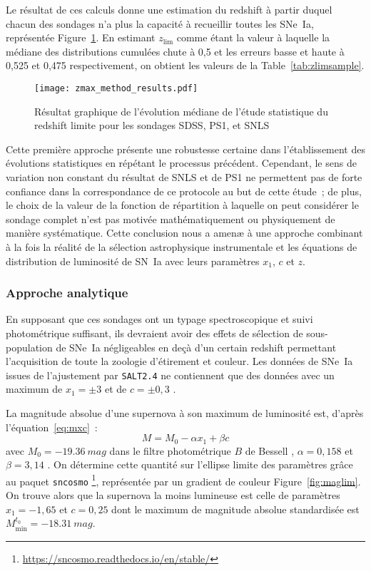 \documentclass[../main/main.tex]{subfiles}
\begin{document}
Le résultat de ces calculs donne une estimation du redshift à partir duquel
chacun des sondages n'a plus la capacité à recueillir toutes les SNe~Ia,
représentée Figure~\ref{fig:zmax_method_results}. En estimant $z_{\lim}$ comme
étant la valeur à laquelle la médiane des distributions cumulées chute à 0,5 et
les erreurs basse et haute à 0,525 et 0,475 respectivement, on obtient les
valeurs de la Table~\ref{tab:zlimsample}.

\begin{figure}[ht]
    \centering
    \texttt{[image: zmax\_method\_results.pdf]}
    \captionsetup{justification=centering}
    \caption{Résultat graphique de l'évolution médiane de l'étude statistique du
    redshift limite pour les sondages SDSS, PS1, et SNLS}
    \label{fig:zmax_method_results}
\end{figure}

Cette première approche présente une robustesse certaine dans l'établissement
des évolutions statistiques en répétant le processus précédent. Cependant, le
sens de variation non constant du résultat de SNLS et de PS1 ne permettent pas
de forte confiance dans la correspondance de ce protocole au but de cette
étude~; de plus, le choix de la valeur de la fonction de répartition à laquelle
on peut considérer le sondage complet n'est pas motivée mathématiquement ou
physiquement de manière systématique. Cette conclusion nous a amenæ à une
approche combinant à la fois la réalité de la sélection astrophysique
instrumentale et les équations de distribution de luminosité de SN~Ia avec leurs
paramètres $x_1$, $c$ et $z$.

\subsubsection{Approche analytique}\label{sssec:maglim}

En supposant que ces sondages ont un typage spectroscopique et suivi
photométrique suffisant, ils devraient avoir des effets de sélection de
sous-population de SNe~Ia négligeables en deçà d'un certain redshift permettant
l'acquisition de toute la zoologie d'étirement et couleur. Les données de SNe~Ia
issues de l'ajustement par \texttt{SALT2.4} ne contiennent que des données avec
un maximum de $x_1 = \pm 3$ et de $c = \pm 0,3$ \citep[][cf
Section~\ref{ssec:salt}]{guy2007, betoule2014}.

La magnitude absolue d'une supernova à son maximum de luminosité est, d'après
l'équation~\ref{eq:mxc}~:
\begin{equation*}
    M = M_0 -\alpha x_1 + \beta c
\end{equation*}
avec $M_0 = \SI{-19,36}{mag}$ dans le filtre photométrique $B$ de Bessell
\citep{kessler2009a, scolnic2014}, $\alpha=0,158$ et $\beta=3,14$
\citep[Table 7,][]{scolnic2018}. On détermine cette quantité sur l'ellipse
limite des paramètres grâce au paquet \texttt{sncosmo}
\footnote{\href{https://sncosmo.readthedocs.io/en/stable/}
{https://sncosmo.readthedocs.io/en/stable/}}, représentée par un gradient de
couleur Figure~\ref{fig:maglim}. On trouve alors que la supernova la moins
lumineuse est celle de paramètres $x_1 = -1,65$ et $c = 0,25$ dont le maximum de
magnitude absolue standardisée est $M_{\min}^{t_0}=\SI{-18,31}{mag}$.
\end{document}
